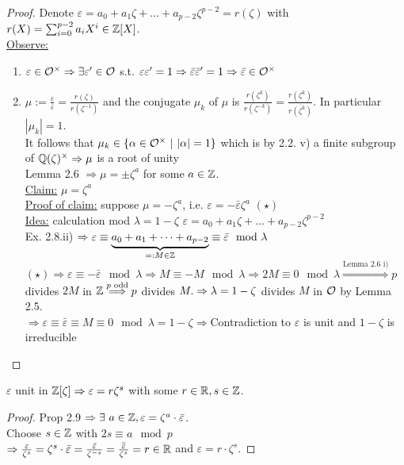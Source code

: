 \begin{proof}
Denote $\varepsilon = a_0 + a_1 \zeta + \dots + a_{p-2}\zeta^{p-2} = r(\zeta)$ with $r(X)=\sum_{i=0}^{p-2} a_iX^i \in \mathbb{Z}[X]$.\\
\underline{Observe:}
\begin{enumerate}
\item $\varepsilon \in \mathcal{O}^\times \Rightarrow \exists \varepsilon' \in \mathcal{O} $ s.t. $ \varepsilon \varepsilon' = 1 \Rightarrow \bar{\varepsilon} \bar{\varepsilon}'=1 \Rightarrow \bar{\varepsilon} \in \mathcal{O}^\times$
\item $\mu := \frac{\varepsilon}{\bar{\varepsilon}}=\frac{r(\zeta)}{r(\zeta^{-1})}$ and the conjugate $\mu_k$ of $\mu$ is $\frac{r(\zeta^k)}{r(\zeta^{-k})}=\frac{r(\zeta^k)}{\overline{r(\zeta^{k})}}$. In particular $|\mu_k|=1$.\\
It follows that $\mu_k \in \{\alpha \in \mathcal{O}^\times \ | \ |\alpha|=1\}$ which is by 2.2. v) a finite subgroup of $\mathbb{Q}(\zeta)^\times \Rightarrow \mu $ is a root of unity\\
Lemma 2.6 $\Rightarrow \mu = \pm \zeta^a$ for some $a \in \mathbb{Z}$.\\
\underline{Claim:} $\mu= \zeta^a$\\
\underline{Proof of claim:} suppose $\mu = -\zeta^a$, i.e. $\varepsilon=-\bar{\varepsilon}\zeta^a$ \quad $(\star )$\\
\underline{Idea:} calculation mod $\lambda=1-\zeta$ \quad $\varepsilon = a_0+a_1\zeta+\dots+a_{p-2}\zeta^{p-2}$\\
Ex. 2.8.ii) $\Rightarrow \varepsilon \equiv \underbrace{a_0 + a_1+ \dots + a_{p-2}}_{ =: M \in \mathbb{Z}} \equiv \bar{\varepsilon} \mod \lambda$\\
$(\star) \Rightarrow \varepsilon \equiv -\bar{\varepsilon} \mod \lambda \Rightarrow M\equiv -M \mod \lambda \Rightarrow 2M \equiv 0 \mod \lambda \stackrel{\text{Lemma 2.6 i)}}{\Longrightarrow} p$ divides $2M$ in $\mathbb{Z} \stackrel{{p \text{ odd}}}{\Longrightarrow} p$ divides $M.\\
\Rightarrow \lambda = 1-\zeta$ divides $M$ in $\mathcal{O}$ by Lemma 2.5.\\
$\Rightarrow \varepsilon \equiv \bar{\varepsilon} \equiv M \equiv 0 \mod \lambda=1-\zeta \Rightarrow $Contradiction to $\varepsilon$ is unit and $1- \zeta$ is irreducible
\end{enumerate}
\end{proof}

\begin{Kor}
$\varepsilon$ unit in $\mathbb{Z}[\zeta] \Rightarrow \varepsilon = r  \zeta^s$ with some $r \in \mathbb{R}, s \in \mathbb{Z}$.
\end{Kor}
\begin{proof}
Prop 2.9 $\Rightarrow \exists \ a \in \mathbb{Z}, \varepsilon= \zeta^a \cdot \bar{\varepsilon}$.\\
Choose $s \in \mathbb{Z}$ with $2s \equiv a \mod p$\\
$\Rightarrow \frac{\varepsilon}{\zeta^s} = \zeta^s \cdot \bar{\varepsilon} = \frac{\bar{\varepsilon}}{\zeta^{-s}} = \bar{\frac{\varepsilon}{\zeta^s}}=r \in \mathbb{R}$ and $\varepsilon = r\cdot \zeta^s$.
\end{proof}


